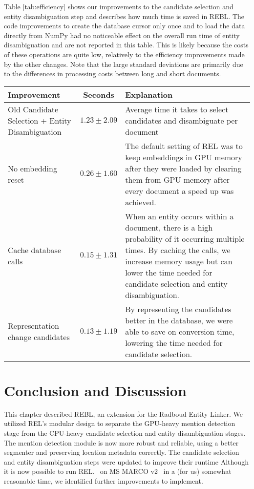 Table \ref{tab:efficiency} shows our improvements to the candidate selection and entity disambiguation step and describes how much time is saved in REBL. 
The code improvements to create the database cursor only once and to load the data directly from NumPy had no noticeable effect on the overall run time of entity disambiguation and are not reported in this table. This is likely because the costs of these operations are quite low, relatively to the efficiency improvements made by the other changes.
Note that the large standard deviations are primarily due to the differences in processing costs between long and short documents.

\begin{sidewaystable}
	\caption{Efficiency improvements for Candidate Selection and Entity Disambiguation. Improvements are calculated over a sample of 5000 documents using a machine with an Intel Xeon Silver 4214 CPU @ 2.20GHz using two cores with 187GB RAM and a GeForce RTX 2080 Ti (11GB) GPU. Improvements are cumulative; the times shown include the previous improvement as well.}
	\label{tab:efficiency}
	\begin{tabular}{p{6cm} c p{10cm}}
		\toprule
		Improvement & Seconds & Explanation\\
		\midrule
		Old Candidate Selection + Entity Disambiguation & $1.23 \pm 2.09$ & Average time it takes to select candidates and disambiguate per document\\
		\midrule
		No embedding reset & $0.26 \pm 1.60$ & The default setting of REL was to keep embeddings in GPU memory after they were loaded by clearing them from GPU memory after every document a speed up was achieved.\\
		Cache database calls & $0.15 \pm 1.31$ & When an entity occurs within a document, there is a high probability of it occurring multiple times. By caching the calls, we increase memory usage but can lower the time needed for candidate selection and entity disambiguation.  \\
		Representation change candidates & $0.13 \pm 1.19$ & By representing the candidates better in the database, we were able to save on conversion time, lowering the time needed for candidate selection.\\
		\bottomrule
	\end{tabular}
\end{sidewaystable}

\section{Conclusion and Discussion}
This chapter described REBL, an extension for the Radboud Entity Linker. We utilized REL's modular design to separate the GPU-heavy mention detection stage from the CPU-heavy candidate selection and entity disambiguation stages. The mention detection module is now more robust and reliable, using a better segmenter and preserving location metadata correctly.
The candidate selection and entity disambiguation steps were updated to improve their runtime Although it is now possible to run REL.~\citep{rel} on MS MARCO v2~\citep{msmarco} in a (for us) somewhat reasonable time, we identified further improvements to implement.

